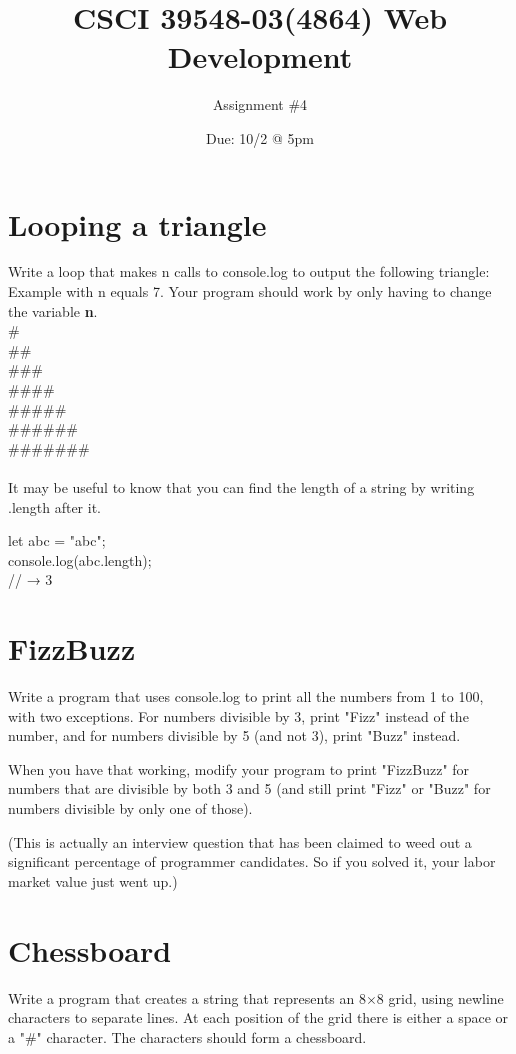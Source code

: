\documentclass[a4paper]{article}
\title{CSCI 39548-03(4864) Web Development}
\author{Assignment \#4}
\date{Due: 10/2 @ 5pm}
\begin{document}
\maketitle

\section{Looping a triangle}
Write a loop that makes n calls to console.log to output the following triangle:\\
Example with n equals 7. Your program should work by only having to change the variable \textbf{n}.\\
\# \\
\#\#\\
\#\#\#\\
\#\#\#\#\\
\#\#\#\#\#\\
\#\#\#\#\#\#\\
\#\#\#\#\#\#\#\\\\
It may be useful to know that you can find the length of a string by writing .length after it.

let abc = "abc";\\
console.log(abc.length);\\
// → 3


\section{FizzBuzz}
Write a program that uses console.log to print all the numbers from 1 to 100, with two exceptions. For numbers divisible by 3, print "Fizz" instead of the number, and for numbers divisible by 5 (and not 3), print "Buzz" instead.

When you have that working, modify your program to print "FizzBuzz" for numbers that are divisible by both 3 and 5 (and still print "Fizz" or "Buzz" for numbers divisible by only one of those).

(This is actually an interview question that has been claimed to weed out a significant percentage of programmer candidates. So if you solved it, your labor market value just went up.)
\newpage

\section{Chessboard}
Write a program that creates a string that represents an 8$\times$8 grid, using newline characters to separate lines. At each position of the grid there is either a space or a "\#" character. The characters should form a chessboard.
\end{document}
